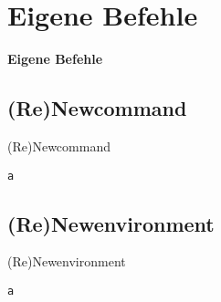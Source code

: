 \section{Eigene Befehle}
\begin{frame}[c]
	\begin{center}
		\LARGE \textbf{Eigene Befehle}
	\end{center}
\end{frame}
\subsection{(Re)Newcommand}
\begin{frame}[c]
	\begin{center}
		\large (Re)Newcommand
	\end{center}
\end{frame}
\begin{frame}[fragile]
	\Ausgabe
	\begin{outputbox}
		
	\end{outputbox}

	\pause\Code
	\begin{lstlisting}
a
	\end{lstlisting}
\end{frame}
\subsection{(Re)Newenvironment}
\begin{frame}[c]
	\begin{center}
		\large (Re)Newenvironment
	\end{center}
\end{frame}
\begin{frame}[fragile]
	\Ausgabe
	\begin{outputbox}
		
	\end{outputbox}
	
	\pause\Code
	\begin{lstlisting}
a
	\end{lstlisting}
\end{frame}